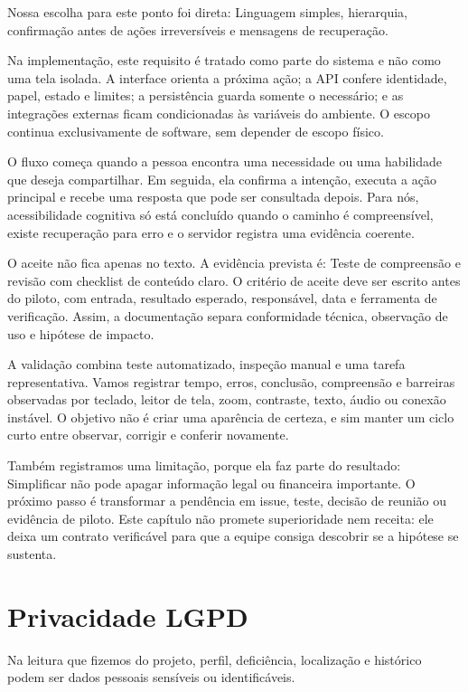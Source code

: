 \documentclass[12pt,oneside,a4paper,article]{abntex2}
\begin{document}
Nossa escolha para este ponto foi direta: Linguagem simples, hierarquia, confirmação antes de ações irreversíveis e mensagens de recuperação.

Na implementação, este requisito é tratado como parte do sistema e não como uma tela isolada. A interface orienta a próxima ação; a API confere identidade, papel, estado e limites; a persistência guarda somente o necessário; e as integrações externas ficam condicionadas às variáveis do ambiente. O escopo continua exclusivamente de software, sem depender de escopo físico.

O fluxo começa quando a pessoa encontra uma necessidade ou uma habilidade que deseja compartilhar. Em seguida, ela confirma a intenção, executa a ação principal e recebe uma resposta que pode ser consultada depois. Para nós, acessibilidade cognitiva só está concluído quando o caminho é compreensível, existe recuperação para erro e o servidor registra uma evidência coerente.

O aceite não fica apenas no texto. A evidência prevista é: Teste de compreensão e revisão com checklist de conteúdo claro. O critério de aceite deve ser escrito antes do piloto, com entrada, resultado esperado, responsável, data e ferramenta de verificação. Assim, a documentação separa conformidade técnica, observação de uso e hipótese de impacto.

A validação combina teste automatizado, inspeção manual e uma tarefa representativa. Vamos registrar tempo, erros, conclusão, compreensão e barreiras observadas por teclado, leitor de tela, zoom, contraste, texto, áudio ou conexão instável. O objetivo não é criar uma aparência de certeza, e sim manter um ciclo curto entre observar, corrigir e conferir novamente.

Também registramos uma limitação, porque ela faz parte do resultado: Simplificar não pode apagar informação legal ou financeira importante. O próximo passo é transformar a pendência em issue, teste, decisão de reunião ou evidência de piloto. Este capítulo não promete superioridade nem receita: ele deixa um contrato verificável para que a equipe consiga descobrir se a hipótese se sustenta.

\section{Privacidade LGPD}
Na leitura que fizemos do projeto, perfil, deficiência, localização e histórico podem ser dados pessoais sensíveis ou identificáveis.
\end{document}
